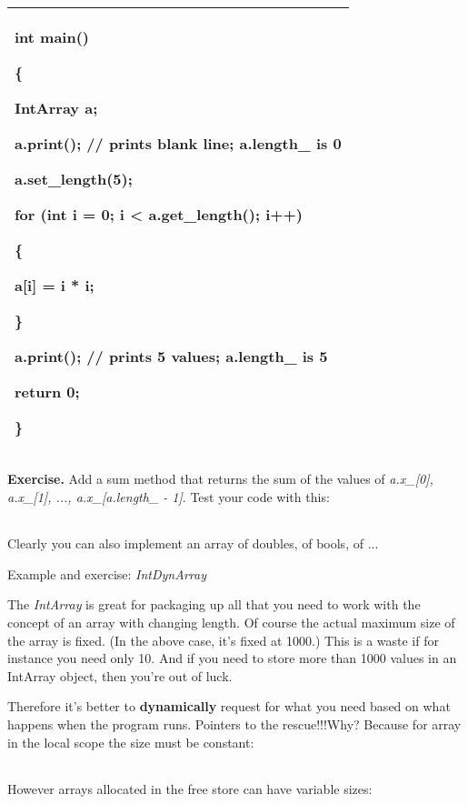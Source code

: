 \documentclass[
]{article}
\begin{document}
\begin{longtable}[]{@{}l@{}}
\toprule
\endhead
\begin{minipage}[t]{0.97\columnwidth}\raggedright
int main()

\{

IntArray a;

a.print(); // prints blank line; a.length\_ is 0

a.set\_length(5);

for (int i = 0; i \textless{} a.get\_length(); i++)

\{

a{[}i{]} = i * i;

\}

a.print(); // prints 5 values; a.length\_ is 5

return 0;

\}\strut
\end{minipage}\tabularnewline
\bottomrule
\end{longtable}

\textbf{Exercise. }Add a sum method that returns the sum of the values
of \emph{a.x\_{[}0{]}, a.x\_{[}1{]}, ..., a.x\_{[}a.length\_ - 1{]}}.
Test your code with this:

\begin{longtable}[]{@{}@{}}
\toprule
\endhead
\bottomrule
\end{longtable}

Clearly you can also implement an array of doubles, of bools, of ...

Example and exercise: \emph{IntDynArray}

The \emph{IntArray} is great for packaging up all that you need to work
with the concept of an array with changing length. Of course the actual
maximum size of the array is fixed. (In the above case, it's fixed at
1000.) This is a waste if for instance you need only 10. And if you need
to store more than 1000 values in an IntArray object, then you're out of
luck.

Therefore it's better to \textbf{dynamically} request for what you need
based on what happens when the program runs. Pointers to the
rescue!!!Why? Because for array in the local scope the size must be
constant:

\begin{longtable}[]{@{}@{}}
\toprule
\endhead
\bottomrule
\end{longtable}

However arrays allocated in the free store can have variable sizes:
\end{document}
